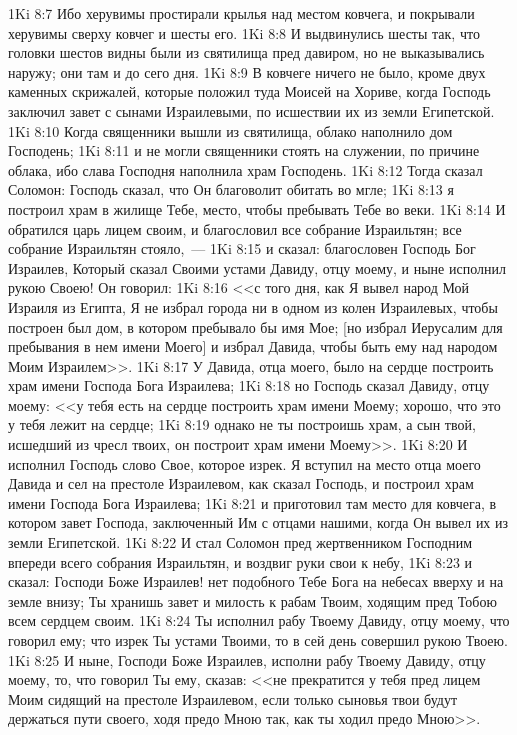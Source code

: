 \vs 1Ki 8:7 Ибо херувимы простирали крылья над местом ковчега, и покрывали херувимы сверху ковчег и шесты его.
\vs 1Ki 8:8 И выдвинулись шесты так, что головки шестов видны были из святилища пред давиром, но не выказывались наружу; они там и до сего дня.
\vs 1Ki 8:9 В ковчеге ничего не было, кроме двух каменных скрижалей, которые положил туда Моисей на Хориве, когда Господь заключил завет с сынами Израилевыми, по исшествии их из земли Египетской.
\vs 1Ki 8:10 Когда священники вышли из святилища, облако наполнило дом Господень;
\vs 1Ki 8:11 и не могли священники стоять на служении, по причине облака, ибо слава Господня наполнила храм Господень.
\vs 1Ki 8:12 Тогда сказал Соломон: Господь сказал, что Он благоволит обитать во мгле;
\vs 1Ki 8:13 я построил храм в жилище Тебе, место, чтобы пребывать Тебе во веки.
\vs 1Ki 8:14 И обратился царь лицем своим, и благословил все собрание Израильтян; все собрание Израильтян стояло,~---
\vs 1Ki 8:15 и сказал: благословен Господь Бог Израилев, Который сказал Своими устами Давиду, отцу моему, и ныне исполнил рукою Своею! Он говорил:
\vs 1Ki 8:16 <<с того дня, как Я вывел народ Мой Израиля из Египта, Я не избрал города ни в одном из колен Израилевых, чтобы построен был дом, в котором пребывало бы имя Мое; [но избрал Иерусалим для пребывания в нем имени Моего] и избрал Давида, чтобы быть ему над народом Моим Израилем>>.
\vs 1Ki 8:17 У Давида, отца моего, было на сердце построить храм имени Господа Бога Израилева;
\vs 1Ki 8:18 но Господь сказал Давиду, отцу моему: <<у тебя есть на сердце построить храм имени Моему; хорошо, что это у тебя лежит на сердце;
\vs 1Ki 8:19 однако не ты построишь храм, а сын твой, исшедший из чресл твоих, он построит храм имени Моему>>.
\vs 1Ki 8:20 И исполнил Господь слово Свое, которое изрек. Я вступил на место отца моего Давида и сел на престоле Израилевом, как сказал Господь, и построил храм имени Господа Бога Израилева;
\vs 1Ki 8:21 и приготовил там место для ковчега, в котором завет Господа, заключенный Им с отцами нашими, когда Он вывел их из земли Египетской.
\rsbpar\vs 1Ki 8:22 И стал Соломон пред жертвенником Господним впереди всего собрания Израильтян, и воздвиг руки свои к небу,
\vs 1Ki 8:23 и сказал: Господи Боже Израилев! нет подобного Тебе Бога на небесах вверху и на земле внизу; Ты хранишь завет и милость к рабам Твоим, ходящим пред Тобою всем сердцем своим.
\vs 1Ki 8:24 Ты исполнил рабу Твоему Давиду, отцу моему, что говорил ему; что изрек Ты устами Твоими, то в сей день совершил рукою Твоею.
\vs 1Ki 8:25 И ныне, Господи Боже Израилев, исполни рабу Твоему Давиду, отцу моему, то, что говорил Ты ему, сказав: <<не прекратится у тебя пред лицем Моим сидящий на престоле Израилевом, если только сыновья твои будут держаться пути своего, ходя предо Мною так, как ты ходил предо Мною>>.
